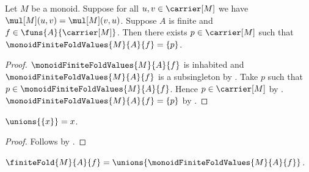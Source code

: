 \begin{theorem}\label{monoid_finite_fold_values_singleton}
    Let $M$ be a monoid.
    Suppose for all $u,v\in\carrier[M]$ we have
        $\mul[M](u,v)=\mul[M](v,u)$.
    Suppose $A$ is finite and $f\in\funs{A}{\carrier[M]}$.
    Then there exists $p\in\carrier[M]$ such that
        $\monoidFiniteFoldValues{M}{A}{f}=\{p\}$.
\end{theorem}
\begin{proof}
    $\monoidFiniteFoldValues{M}{A}{f}$ is inhabited and
        $\monoidFiniteFoldValues{M}{A}{f}$ is a subsingleton by
        .
    Take $p$ such that
        $p\in\monoidFiniteFoldValues{M}{A}{f}$.
    Hence $p\in\carrier[M]$ by
        .
    $\monoidFiniteFoldValues{M}{A}{f}=\{p\}$ by
        .
\end{proof}

\begin{proposition}\label{monoid_unions_singleton}
    $\unions{\{x\}}=x$.
\end{proposition}
\begin{proof}
    Follows by .
\end{proof}

\begin{definition}\label{monoid_finite_fold}
    $\finiteFold{M}{A}{f}=\unions{\monoidFiniteFoldValues{M}{A}{f}}$.
\end{definition}

